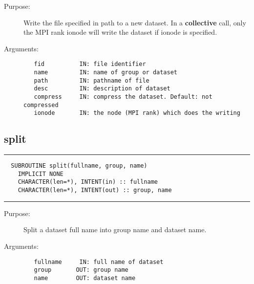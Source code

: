 \documentclass[a4paper]{article}
\begin{document}
\begin{description}
\item[Purpose:] \mbox{}

Write the file specified in path to a new dataset.
In a {\bfseries collective} call, only the MPI rank
{\ttfamily ionode} will write the dataset if {\ttfamily ionode} is specified.

\item[Arguments:] \mbox{}

\begin{verbatim}
   fid          IN: file identifier
   name         IN: name of group or dataset
   path         IN: pathname of file
   desc         IN: description of dataset
   compress     IN: compress the dataset. Default: not compressed
   ionode       IN: the node (MPI rank) which does the writing

\end{verbatim}


\end{description}





\subsection{split}

\par
\addvspace{\medskipamount}
\nopagebreak\hrule
\begin{verbatim}
  SUBROUTINE split(fullname, group, name)
    IMPLICIT NONE
    CHARACTER(len=*), INTENT(in) :: fullname
    CHARACTER(len=*), INTENT(out) :: group, name
\end{verbatim}
\nopagebreak\hrule
\addvspace{\medskipamount}

\begin{description}
\item[Purpose:] \mbox{}

Split a dataset full name into group name and dataset name.

\item[Arguments:] \mbox{}

\begin{verbatim}
   fullname     IN: full name of dataset
   group       OUT: group name
   name        OUT: dataset name

\end{verbatim}


\end{description}
\end{document}

